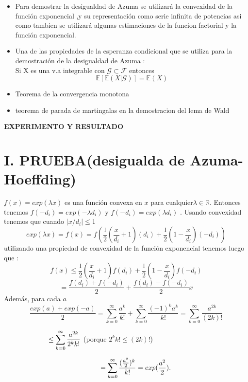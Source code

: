 \documentclass[letterpaper, 10 pt, conference]{ieeeconf}  %
\providecommand{\abs}[1]{\lvert#1\rvert}
\begin{document}
\begin{itemize}
    \item Para demostrar la desigualdad de Azuma se utilizará la convexidad de la función exponencial ,y su representación como serie infinita de potencias asi como tambien se utilizará algunas estimaciones de la funcion factorial y la función exponencial.
    \item Una de las propiedades de la esperanza condicional que se utiliza para la demostración de la desigualdad de Azuma :\\ Si X es una v.a integrable con $\mathcal{G}\subset \mathcal{F}$ entonces \[\mathbb{E}[\mathbb{E}(X|\mathcal{G})]=\mathbb{E}(X)\]
    \item Teorema de la convergencia monotona
    \item teorema de parada de martingalas en la demostracion del lema de Wald

    
\end{itemize}

\begin{center}
\textbf{EXPERIMENTO Y RESULTADO}
\end{center}
\section*{I. PRUEBA(desigualda de Azuma-Hoeffding)}
$f(x)= exp(\lambda x)$ es una función convexa en $x$ para cualquier$\lambda \in \mathbb{R}$.
Entonces tenemos $f(-d_{i}) = exp (-\lambda d_{i})$ y $f(-d_{i}) = exp (\lambda d_{i})$ .
Usando convexidad tenemos que cuando $\abs{x/d_{i}}\leq 1$
\[ exp(\lambda x) = f(x)=f\left(\dfrac{1}{2}( \dfrac{x}{d_{i}}+1)(d_{i})+\dfrac{1}{2}( 1-\dfrac{x}{d_{i}})(-d_{i})\right) 
\]
utilizando una propiedad de convexidad de la función exponencial tenemos luego que :
\[ f(x)\leq  \dfrac{1}{2}\left(\dfrac{x}{d_{i}}+1\right)f(d_{i})+\dfrac{1}{2}\left(1-\dfrac{x}{d_{i}}\right)f(-d_{i})
\]
\begin{equation}
    = \dfrac{f(d_{i})+f(-d_{i})}{2}+\dfrac{f(d_{i})-f(-d_{i})}{2}x
\end{equation}
Además, para cada $a$
\[ \dfrac{exp(a)+exp(-a)}{2}= \displaystyle\sum_{k=0}^{\infty}\dfrac{a^{k}}{k!}+\displaystyle\sum_{k=0}^{\infty}\dfrac{(-1)^{k}a^{k}}{k!}=\displaystyle\sum_{k=0}^{\infty}\dfrac{a^{2k}}{(2k)!}
\]
\begin{center}
  $ \hspace{2.3cm}\leq \displaystyle\sum_{k=0}^{\infty}\dfrac{a^{2k}}{2^{k}k!}$  (porque $2^{k}k!\leq(2k)!$)
\end{center} 
\begin{equation}
   \hspace{0.99cm} = \displaystyle\sum_{k=0}^{\infty}\dfrac{(\frac{a^2}{2})^{k}}{k!}= exp(\frac{a^2}{2}). 
\end{equation}
\end{document}
